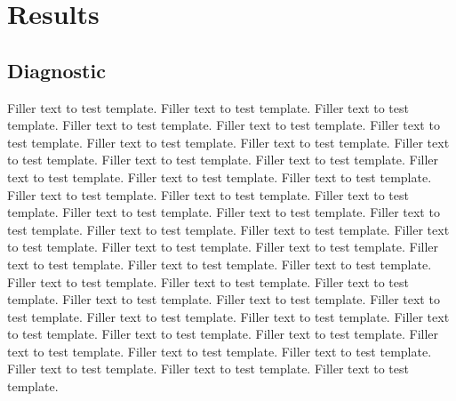 
\chapter{Results}

\section{Diagnostic}

Filler text to test template. Filler text to test template. Filler text to
test template. Filler text to test template. Filler text to test template.
Filler text to test template. Filler text to test template. Filler text to
test template. Filler text to test template. Filler text to test template.
Filler text to test template. Filler text to test template. Filler text to
test template. Filler text to test template. Filler text to test template.
Filler text to test template. Filler text to test template. Filler text to
test template. Filler text to test template. Filler text to test template.
Filler text to test template. Filler text to test template. Filler text to
test template. Filler text to test template. Filler text to test template.
Filler text to test template. Filler text to test template. Filler text to
test template. Filler text to test template. Filler text to test template.
Filler text to test template. Filler text to test template. Filler text to
test template. Filler text to test template. Filler text to test template.
Filler text to test template. Filler text to test template. Filler text to
test template. Filler text to test template. Filler text to test template.
Filler text to test template. Filler text to test template. Filler text to
test template. Filler text to test template. Filler text to test template.


